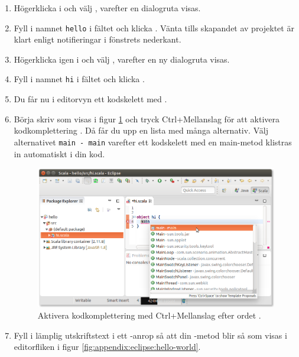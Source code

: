 \begin{enumerate}
\item Högerklicka i  och välj , varefter en dialogruta visas.

\item Fyll i namnet \texttt{hello} i fältet  och klicka . Vänta tills skapandet av projektet är klart enligt notifieringar i fönstrets nederkant.

\item Högerklicka igen i  och välj , varefter en ny dialogruta visas.

\item Fyll i namnet \texttt{hi} i fältet  och klicka .

\item Du får nu i editorvyn ett kodskelett med .

\item Börja skriv  som visas i figur \ref{fig:appendix:eclipse:complete-main} och tryck Ctrl+Mellanslag för att aktivera kodkomplettering . Då får du upp en lista med många alternativ. Välj alternativet \texttt{main - main} varefter ett kodskelett med en main-metod klistras in automatiskt i din kod.

\begin{figure}
\centering
\includegraphics[width=1.0\textwidth]{../img/eclipse/eclipse-complete-main.png}
\caption{Aktivera kodkomplettering med Ctrl+Mellanslag efter ordet .}
\label{fig:appendix:eclipse:complete-main}
\end{figure}

\item Fyll i lämplig utskriftstext i ett -anrop så att din -metod blir så som visas i editorfliken i figur \ref{fig:appendix:eclipse:hello-world}.


\end{enumerate}
